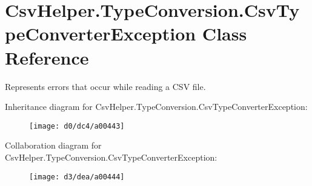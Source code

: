 \hypertarget{a00058}{\section{Csv\-Helper.\-Type\-Conversion.\-Csv\-Type\-Converter\-Exception Class Reference}
\label{a00058}
}


Represents errors that occur while reading a C\-S\-V file.  




Inheritance diagram for Csv\-Helper.\-Type\-Conversion.\-Csv\-Type\-Converter\-Exception\-:
\nopagebreak
\begin{figure}[H]
\begin{center}
\leavevmode
\texttt{[image: d0/dc4/a00443]}
\end{center}
\end{figure}


Collaboration diagram for Csv\-Helper.\-Type\-Conversion.\-Csv\-Type\-Converter\-Exception\-:
\nopagebreak
\begin{figure}[H]
\begin{center}
\leavevmode
\texttt{[image: d3/dea/a00444]}
\end{center}
\end{figure}
